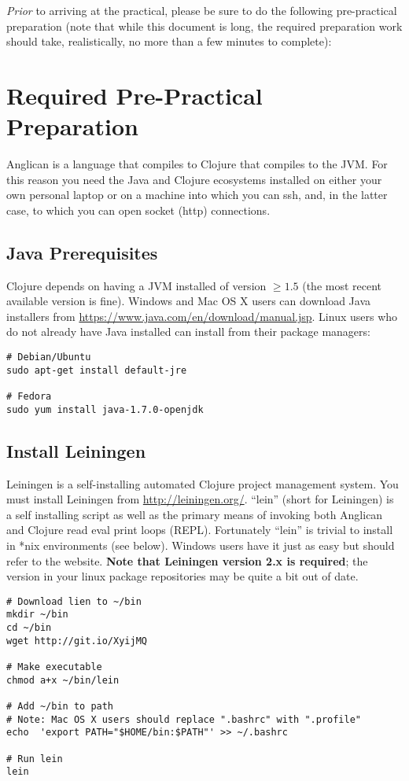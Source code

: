 \documentclass{article}
\begin{document}
{\em Prior} to arriving at the practical, please be sure to do the following 
pre-practical preparation (note that while this document is long, the required
preparation work should take, realistically, no more than a few minutes to complete):

\section{Required Pre-Practical Preparation}

Anglican is a language that compiles to Clojure that compiles to the JVM.  For this reason
you need the Java and Clojure ecosystems installed on either your own personal laptop or on a 
machine into which you can ssh, and, in the latter case, to which you can open socket (http) connections.  

\subsection{Java Prerequisites}

Clojure depends on having a JVM installed of version $\geq 1.5$ (the most recent available version is fine).  Windows and Mac OS X users can download Java installers from \url{https://www.java.com/en/download/manual.jsp}. Linux users who do not already have Java installed can install from their package managers:

\begin{verbatim}
# Debian/Ubuntu
sudo apt-get install default-jre

# Fedora
sudo yum install java-1.7.0-openjdk
\end{verbatim}

\subsection{Install Leiningen}

Leiningen is a self-installing automated Clojure project management system.  
You must install Leiningen from \url{http://leiningen.org/}.  ``lein'' 
(short for Leiningen) is a self installing script as well as the primary means
of invoking both Anglican and Clojure read eval print loops (REPL).  Fortunately
``lein'' is trivial to install in *nix environments (see below).  Windows
users have it just as easy but should refer to the website.
\textbf{ Note that Leiningen version 2.x is required}; the version in your 
linux package repositories may be quite a bit out of date.

\begin{verbatim}
# Download lien to ~/bin
mkdir ~/bin
cd ~/bin
wget http://git.io/XyijMQ

# Make executable
chmod a+x ~/bin/lein

# Add ~/bin to path
# Note: Mac OS X users should replace ".bashrc" with ".profile"
echo  'export PATH="$HOME/bin:$PATH"' >> ~/.bashrc 

# Run lein
lein
\end{verbatim}
\end{document}
